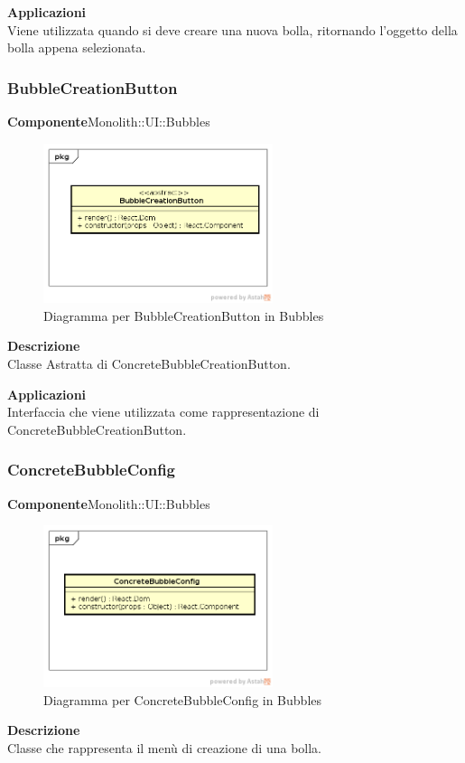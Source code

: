\textbf{Applicazioni}\\
Viene utilizzata quando si deve creare una nuova bolla, ritornando l'oggetto della bolla appena selezionata. 


\clearpage

\subsubsection{BubbleCreationButton}
\textbf{Componente}Monolith::UI::Bubbles\\
   \FloatBarrier
   \begin{figure}[ht]
   \centering
   \includegraphics[width=0.6\textwidth]{img/single-BubbleCreationButton}
   \caption{{Diagramma per BubbleCreationButton in Bubbles}}
\end{figure}
\FloatBarrier
\textbf{Descrizione}\\
Classe Astratta di ConcreteBubbleCreationButton. 


\textbf{Applicazioni}\\
Interfaccia che viene utilizzata come rappresentazione di ConcreteBubbleCreationButton. 


\clearpage

\subsubsection{ConcreteBubbleConfig}
\textbf{Componente}Monolith::UI::Bubbles\\
   \FloatBarrier
   \begin{figure}[ht]
   \centering
   \includegraphics[width=0.6\textwidth]{img/single-ConcreteBubbleConfig}
   \caption{{Diagramma per ConcreteBubbleConfig in Bubbles}}
\end{figure}
\FloatBarrier
\textbf{Descrizione}\\
Classe che rappresenta il menù di creazione di una bolla.


